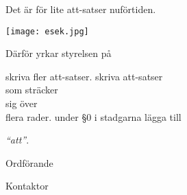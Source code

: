 \documentclass[../main/handlingar.tex]{subfiles}
\begin{document}

Det är för lite att-satser nuförtiden.

\begin{center}
    \texttt{[image: esek.jpg]}
\end{center}

Därför yrkar styrelsen på
\begin{attsatser}
    \att skriva fler att-satser.
    \att
    skriva att-satser\\
    som sträcker\\
    sig över\\
    flera rader.
    \att under \S0 i stadgarna lägga till\par
    \emph{``att''}.
\end{attsatser}

\begin{signatures}{2}
    \ist
    \signature{\ordf}{Ordförande}
    \signature{\sekr}{Kontaktor}
\end{signatures}
\end{document}
